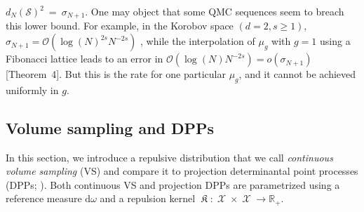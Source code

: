 \documentclass[twoside,11pt]{book}
\numberwithin{theorem}{chapter}
\numberwithin{definition}{chapter}
\numberwithin{proposition}{chapter}
\numberwithin{corollary}{chapter}
\numberwithin{example}{chapter}
\numberwithin{lemma}{chapter}
\DeclareMathOperator*{\KDPP}{\mathfrak{K}}
\DeclareMathOperator{\X}{\mathcal{X}}
\DeclareMathOperator{\Ltwo}{\mathbb{L}_{2}(\mathrm{d} \omega)}
\newcommand{\pc}[1]{\textcolor{blue}{#1}}
\begin{document}
$d_{N}(\mathcal{S})^{2}~=~\sigma_{N+1}$.
One may object that some QMC sequences seem to breach this lower bound. For example, in the Korobov space $(d = 2, s \geq 1)$, $\sigma_{N+1} = \mathcal{O}(\log(N)^{2s} N^{-2s})$ \citep{Bac17}, while the interpolation of $\mu_{g}$ with $g = 1$ using a Fibonacci lattice leads to an error in $\mathcal{O}(\log (N) N^{-2s}) = o(\sigma_{N+1})$ \citep{BiTeYu12}[Theorem~4]. But this is the rate for one particular $\mu_{g}$, and it cannot be achieved uniformly in $g$.


\subsection{Volume sampling and DPPs}\label{sec:VS_DPP}
In this section, we introduce a repulsive distribution that we call \emph{continuous volume sampling} (VS) and compare it to projection determinantal point processes (DPPs; \citep{HoKrPeVi06}). Both continuous VS and projection DPPs are parametrized using a reference measure $\mathrm{d} \omega$ and a repulsion kernel $\KDPP : \X \times \X \rightarrow \mathbb{R}_{+}$.
\end{document}
